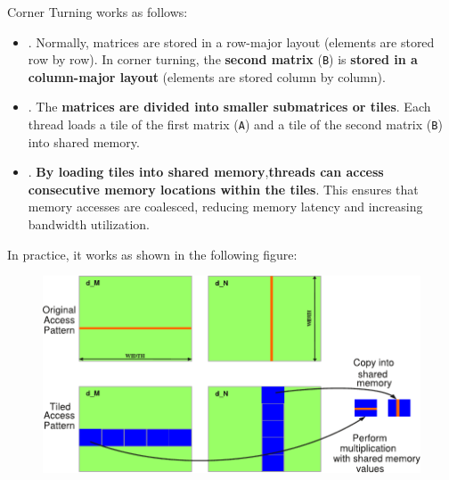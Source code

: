 \highspace
Corner Turning works as follows:
\begin{itemize}
    \item {}. Normally, matrices are stored in a row-major layout (elements are stored row by row). In corner turning, the \textbf{second matrix} (\texttt{B}) is \textbf{stored in a column-major layout} (elements are stored column by column).

    \item {}. The \textbf{matrices are divided into smaller submatrices or tiles}. Each thread loads a tile of the first matrix (\texttt{A}) and a tile of the second matrix (\texttt{B}) into shared memory.

    \item {}. \textbf{By loading tiles into shared memory},\break \textbf{threads can access consecutive memory locations within the tiles}. This ensures that memory accesses are coalesced, reducing memory latency and increasing bandwidth utilization.
\end{itemize}
In practice, it works as shown in the following figure:
\begin{figure}[!htp]
    \centering
    \includegraphics[width=\textwidth]{img/cuda-corner-turning-1.pdf}
\end{figure}
